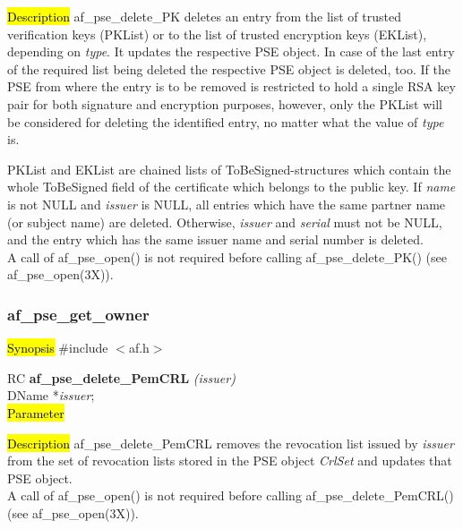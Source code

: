

\hl{Description}
af\_pse\_delete\_PK deletes an entry from the list of trusted 
verification keys (PKList) or to the list of trusted encryption keys (EKList), depending
on {\em type}. It updates the respective PSE object. In case of the last entry of the required
list being deleted the respective PSE object is deleted, too.
If the PSE from where the entry is to be removed is restricted to hold a single RSA key pair
for both signature and encryption purposes, however, only the PKList will be considered for deleting the identified entry,
no matter what the value of {\em type} is.

PKList and EKList are chained lists of ToBeSigned-structures which contain the
whole ToBeSigned field of the certificate which belongs to the public key. If 
{\em name} is not NULL and {\em issuer} is NULL, all entries which have the same partner name (or
subject name) are deleted. Otherwise, {\em issuer} and {\em serial} must not
be NULL, and the entry which has the same issuer name and serial number is
deleted.  
\\ [1em]
A call of af\_pse\_open() is not required before calling af\_pse\_delete\_PK()
(see af\_pse\_open(3X)).

\subsubsection{af\_pse\_get\_owner}
\label{af_delete_PemCRL}
\hl{Synopsis}
\#include $<$af.h$>$ 

RC {\bf af\_pse\_delete\_PemCRL} {\em (issuer)} \\
DName *{\em issuer}; \\
\hl{Parameter}

\hl{Description}
af\_pse\_delete\_PemCRL removes the revocation list issued by {\em issuer} from the set
of revocation lists stored in the PSE object {\em CrlSet} and updates that PSE object. 
\\ [1em]
A call of af\_pse\_open() is not required before calling af\_pse\_delete\_PemCRL()
(see af\_pse\_open(3X)).



